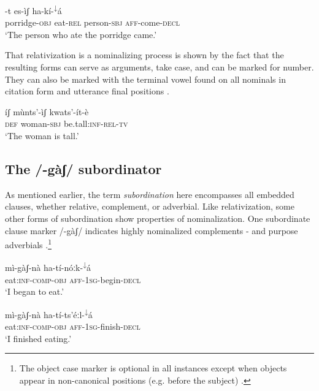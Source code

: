 \documentclass[output=paper]{langsci/langscibook}
\begin{document}
\ea\label{ex:mahland:44}
\gll [k\`{a}ːl-l\`{a}           m\'{i}]-t     es-\`{i}ʃ           ha-k\'{i}-\textsuperscript{↓}\'{a}\\
porridge\textsc{{}-obj}   eat\textsc{{}-rel}    person\textsc{{}-sbj}   \textsc{aff-}come\textsc{{}-decl }\\
\glt `The person who ate the porridge came.'
\z

That relativization is a nominalizing process is shown by the fact that the resulting forms can serve as arguments, take case, and can be marked for number. They can also be marked with the terminal vowel found on all nominals in citation form and utterance final positions . 


\ea\label{ex:mahland:45}
\gll \'{i}ʃ        m\`{u}nts'-\`{i}ʃ        kwats'-\'{i}t-\`{e}\\
\textsc{def}      woman-\textsc{sbj}     be.tall\textsc{:inf-rel-tv}\\
`The woman is tall.'
\z

\subsection{The /-g\`{a}ʃ/ subordinator}\label{sec:mahland:2.3}

As mentioned earlier, the term \textit{subordination} here encompasses all embedded clauses, whether relative, complement, or adverbial. Like relativization, some other forms of subordination show properties of nominalization. One subordinate clause marker /-g\`{a}ʃ/ indicates highly nominalized complements - and purpose adverbials .\footnote{The object case marker is optional in all instances except when objects appear in non-canonical positions (e.g. before the subject) \citep[327]{Ahland2012}.}


\ea\label{ex:mahland:46}
\gll m\`{i}-g\`{a}ʃ-n\`{a}              ha-t\'{i}-n\'{o}ːk-\textsuperscript{↓}\'{a}  \\
eat:\textsc{inf-comp-obj   aff-1sg}{}-begin-\textsc{decl}   \\
\glt `I began to eat.'
\z

\ea\label{ex:mahland:47}
\gll m\`{i}-g\`{a}ʃ-n\`{a}              ha-t\'{i}-ts'\'{e}ːl-\textsuperscript{↓}\'{a}  \\
eat:\textsc{inf-comp-obj   aff-1sg}{}-finish-\textsc{decl}   \\
\glt `I finished eating.'
\z
\end{document}
